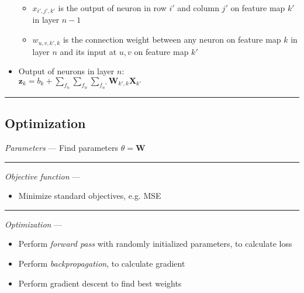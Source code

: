 \begin{itemize}
\begin{itemize}
        \item $x_{i',j',k'}$ is the output of neuron in row $i'$ and column $j'$ on feature map $k'$ in layer $n-1$
        \item $w_{u,v,k',k}$ is the connection weight between any neuron on feature map $k$ in layer $n$ and its input at $u,v$ on feature map $k'$
    \end{itemize}
    \item Output of neurons in layer $n$: \\
    $\boldsymbol{z}_k = b_k + \sum_{f_n} \sum_{f_w} \sum_{f_n'} \boldsymbol{W}_{k',k} \boldsymbol{X}_{k'}$
\end{itemize}

{\color{black}\hrule height 0.001mm}

\subsection*{Optimization}
\emph{Parameters} --- Find parameters $\theta = \boldsymbol{W}$

{\color{lightgray}\hrule height 0.001mm}

\emph{Objective function} --- 
\begin{itemize}
    \item Minimize standard objectives, e.g. MSE
\end{itemize}

{\color{lightgray}\hrule height 0.001mm}

\emph{Optimization} ---
\begin{itemize}
    \item Perform \emph{forward pass} with randomly initialized parameters, to calculate loss
    \item Perform \emph{backpropagation}, to calculate gradient
    \item Perform gradient descent to find best weights 
\end{itemize}